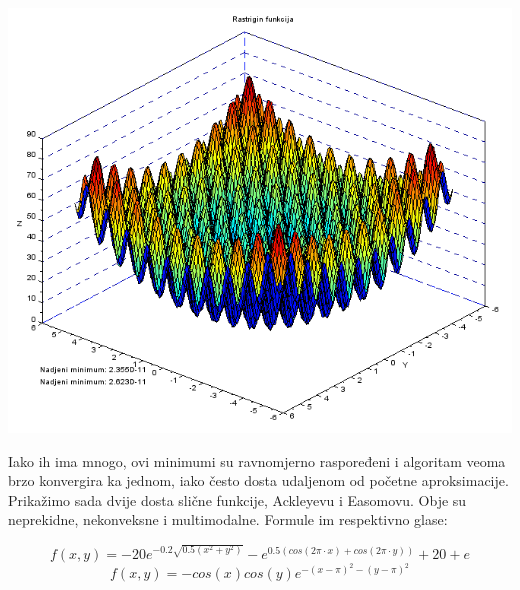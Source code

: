 \documentclass[bosnian,12pt,a4paper]{report}
\begin{document}
\begin{center}
   \includegraphics[scale=0.7]{rastriginfunction.png}
\end{center}

\justify
Iako ih ima mnogo, ovi minimumi su ravnomjerno raspoređeni i algoritam veoma brzo konvergira ka jednom, iako često dosta udaljenom od početne aproksimacije.\\


\justify
Prikažimo sada dvije dosta slične funkcije, Ackleyevu i Easomovu. Obje su neprekidne, nekonveksne i multimodalne. Formule im respektivno glase:

$$f(x, y) = -20e^{-0.2\sqrt{0.5(x^2 + y^2)}} - e^{0.5(cos(2\pi\cdot x) + cos(2\pi \cdot y ))} + 20 + e$$ 
$$f(x, y) = -cos(x)cos(y)e^{-(x-\pi)^2 - (y-\pi)^2}$$

\vspace*{0.5cm}
\end{document}
